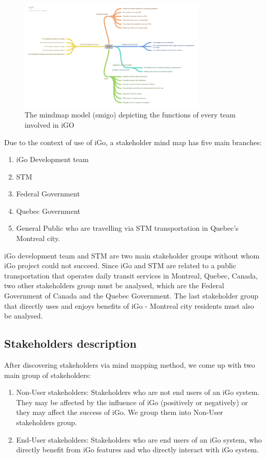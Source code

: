 \documentclass[11pt, english]{article}
\begin{document}
\begin{figure}[H]
  
  \includegraphics[width=0.8\textwidth]{iGO_stake.png}
  \centering
  \caption{The mindmap model (\gls{smigo}) depicting the functions of every team involved in iGO}
  \end{figure}
  Due to the context of use of iGo, a stakeholder mind map has five main branches:
  \begin{enumerate}
      \item iGo Development team 
\item STM 
\item Federal Government
\item Quebec Government
\item General Public who are travelling via STM transportation in Quebec’s Montreal city. 

  \end{enumerate}


iGo development team and STM are two main stakeholder groups without whom iGo project could not succeed. Since iGo and STM are related to a public transportation that operates daily transit services in Montreal, Quebec, Canada, two other stakeholders group must be analysed, which are the Federal Government of Canada and the Quebec Government. The last stakeholder group that directly uses and enjoys benefits of iGo - Montreal city residents must also be analysed. 

\subsection{Stakeholders description}
After discovering stakeholders via mind mapping method, we come up with two main group of stakeholders:
\begin{enumerate}
    \item Non-User stakeholders: Stakeholders who are not end users of an iGo system. They may be affected by the influence of iGo (positively or negatively) or they may affect the success of iGo. We group them into Non-User stakeholders group.
    \item End-User stakeholders:
Stakeholders who are end users of an iGo system, who directly benefit from iGo features and who directly interact with iGo system.

\end{enumerate}
\end{document}
